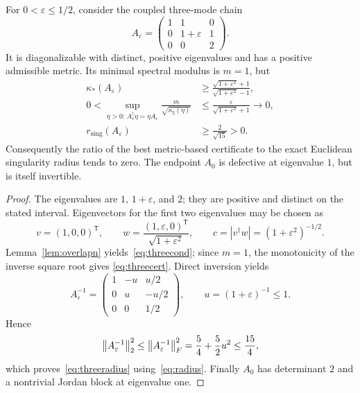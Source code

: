 \begin{theorem}
\label{thm:counterexample}
For $0<\varepsilon\leq1/2$, consider the coupled three-mode chain
\begin{equation}\label{eq:threelevel}
 A_\varepsilon=
 \begin{pmatrix}
 1&1&0\\
 0&1+\varepsilon&1\\
 0&0&2
 \end{pmatrix}.
\end{equation}
It is diagonalizable with distinct, positive eigenvalues and has a
positive admissible metric. Its minimal spectral modulus is $m=1$, but
\begin{align}
 \kappa_*(A_\varepsilon)&\geq
 \frac{\sqrt{1+\varepsilon^2}+1}
 {\sqrt{1+\varepsilon^2}-1},\label{eq:threecond}\\
 0<\sup_{\eta>0:\,A_\varepsilon^\dagger\eta
 =\eta A_\varepsilon}
 \frac{m}{\sqrt{\kappa_2(\eta)}}
 &\leq\frac{\varepsilon}
 {\sqrt{1+\varepsilon^2}+1}
 \longrightarrow0,\label{eq:threecert}\\
 r_{\mathrm{sing}}(A_\varepsilon)
 &\geq\frac{2}{\sqrt{15}}>0.
 \label{eq:threeradius}
\end{align}
Consequently the ratio of the best metric-based certificate to the
exact Euclidean singularity radius tends to zero. The endpoint
$A_0$ is defective at eigenvalue $1$, but is itself invertible.
\end{theorem}
\begin{proof}
The eigenvalues are $1$, $1+\varepsilon$, and $2$; they are
positive and distinct on the stated interval. Eigenvectors for the
first two eigenvalues may be chosen as
\begin{equation}
 v=(1,0,0)^\mathsf{T},\qquad
 w=\frac{(1,\varepsilon,0)^\mathsf{T}}
 {\sqrt{1+\varepsilon^2}},\qquad
 c=|v^\dagger w|=(1+\varepsilon^2)^{-1/2}.
\end{equation}
Lemma~\ref{lem:overlapn} yields~\eqref{eq:threecond}; since
$m=1$, the monotonicity of the inverse square root gives
\eqref{eq:threecert}. Direct inversion yields
\begin{equation}\label{eq:threeinverse}
 A_\varepsilon^{-1}=
 \begin{pmatrix}
 1&-u&u/2\\
 0&u&-u/2\\
 0&0&1/2
 \end{pmatrix},\qquad u=(1+\varepsilon)^{-1}\leq1.
\end{equation}
Hence
\begin{equation}
 \left\lVert A_\varepsilon^{-1}\right\rVert_2^2
 \leq\left\lVert A_\varepsilon^{-1}\right\rVert_F^2
 =\frac54+\frac52u^2\leq\frac{15}{4},
\end{equation}
which proves~\eqref{eq:threeradius} using~\eqref{eq:radius}.
Finally $A_0$ has determinant $2$ and a nontrivial Jordan block
at eigenvalue one.
\end{proof}

